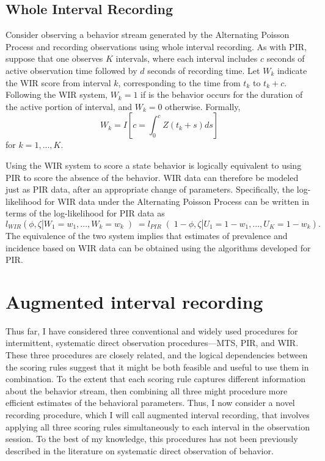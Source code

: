 \documentclass[man, noextraspace, floatsintext]{apa6}\usepackage[]{graphicx}\usepackage[]{color}
\begin{document}


\subsection{Whole Interval Recording}
\label{sec:WIR}

Consider observing a behavior stream generated by the Alternating Poisson Process and recording observations using whole interval recording. 
As with PIR, suppose that one observes $K$ intervals, where each interval includes $c$ seconds of active observation time followed by $d$ seconds of recording time. 
Let $W_k$ indicate the WIR score from interval $k$, corresponding to the time from $t_k$ to $t_k + c$. 
Following the WIR system, $W_k = 1$ if is the behavior occurs for the duration of the active portion of interval, and $W_k = 0$ otherwise. 
Formally, 
\begin{equation}
W_k = I\left[ c = \int_0^c Z\left(t_k + s \right) ds\right]
\end{equation}
for $k = 1,...,K$. 

Using the WIR system to score a state behavior is logically equivalent to using PIR to score the absence of the behavior. 
WIR data can therefore be modeled just as PIR data, after an appropriate change of parameters. 
Specifically, the log-likelihood for WIR data under the Alternating Poisson Process can be written in terms of the log-likelihood for PIR data as
\begin{equation}
l_{WIR}\left(\phi, \zeta | W_1 = w_1,...,W_k = w_k \left) = l_{PIR}\right(1 - \phi, \zeta | U_1 = 1 - w_1,...,U_K = 1 - w_k\right).
\end{equation}
The equivalence of the two system implies that estimates of prevalence and incidence based on WIR data can be obtained using the algorithms developed for PIR. 


\section{Augmented interval recording}
\label{sec:AIR}

Thus far, I have considered three conventional and widely used procedures for intermittent, systematic direct observation procedures---MTS, PIR, and WIR. 
These three procedures are closely related, and the logical dependencies between the scoring rules suggest that it might be both feasible and useful to use them in combination. 
To the extent that each scoring rule captures different information about the behavior stream, then combining all three might procedure more efficient estimates of the behavioral parameters. Thus, I now consider a novel recording procedure, which I will call augmented interval recording, that involves applying all three scoring rules simultaneously to each interval in the observation session.
To the best of my knowledge, this procedures has not been previously described in the literature on systematic direct observation of behavior. 
\end{document}
